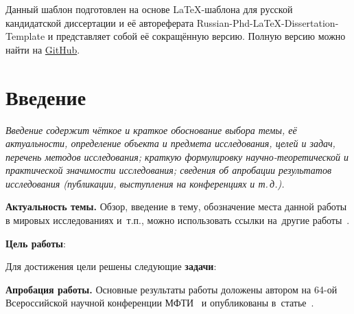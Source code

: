 Данный шаблон подготовлен на основе LaTeX-шаблона для русской кандидатской диссертации и её автореферата Russian-Phd-LaTeX-Dissertation-Template и представляет собой её сокращённую версию.
Полную версию можно найти на
\href{https://github.com/AndreyAkinshin/Russian-Phd-LaTeX-Dissertation-Template}{GitHub}.
\newpage

\chapter*{Введение}                         %

\textit{Введение содержит чёткое и краткое обоснование выбора темы, её актуальности, определение объекта и предмета исследования, целей и задач, перечень методов исследования; краткую формулировку научно-теоретической и практической значимости исследования; сведения об апробации результатов исследования (публикации, выступления на конференциях и т.\,д.).}
\bigskip

\textbf{Актуальность темы.}
Обзор, введение в тему, обозначение места данной работы в мировых исследованиях и~т.\:п., можно использовать ссылки на~другие работы~\cite{MIPT2021}.

\textbf{Цель работы}:
\aim

Для достижения цели решены следующие \textbf{задачи}:
\tasks

\textbf{Апробация работы.}
Основные результаты работы доложены автором на 64-ой Всероссийской научной конференции МФТИ~\cite{confbib1} и опубликованы в~статье~\cite{bib1}.
